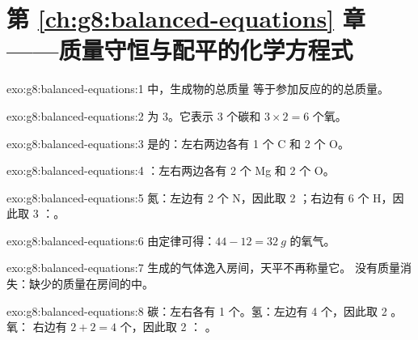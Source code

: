 \section*{第 \ref{ch:g8:balanced-equations} 章——质量守恒与配平的化学方程式}

\begin{solution}{exo:g8:balanced-equations:1}
中，生成物的总质量
等于参加反应的的总质量。
\end{solution}

\begin{solution}{exo:g8:balanced-equations:2}
为 3。它表示 3 个碳和 $3 \times 2 = 6$
个氧。
\end{solution}

\begin{solution}{exo:g8:balanced-equations:3}
是的：左右两边各有 1 个 C 和 2 个 O。
\end{solution}

\begin{solution}{exo:g8:balanced-equations:4}
：左右两边各有 2 个 Mg 和 2 个 O。
\end{solution}

\begin{solution}{exo:g8:balanced-equations:5}
氮：左边有 2 个 N，因此取 2 ；右边有 6 个 H，因此取 3
：。
\end{solution}

\begin{solution}{exo:g8:balanced-equations:6}
由定律可得：$44 - 12 = \qty{32}{g}$ 的氧气。
\end{solution}

\begin{solution}{exo:g8:balanced-equations:7}
生成的气体逸入房间，天平不再称量它。
没有质量消失：缺少的质量在房间的中。
\end{solution}

\begin{solution}{exo:g8:balanced-equations:8}
碳：左右各有 1 个。氢：左边有 4 个，因此取 2 。氧：
右边有 $2 + 2 = 4$ 个，因此取 2 ：
。
\end{solution}

